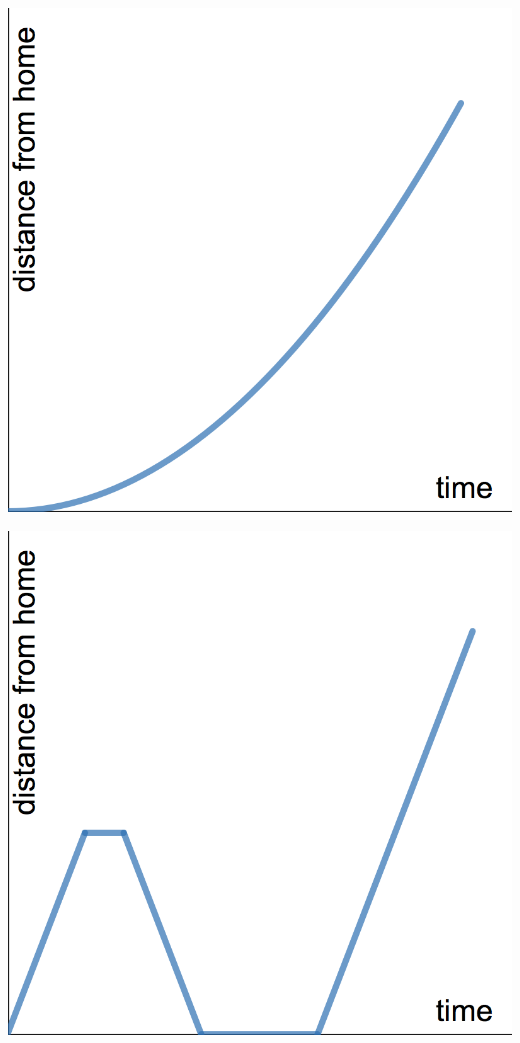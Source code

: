 \documentclass[11pt]{exam}
\theoremstyle{definition}
\begin{document}
\begin{questions}
\begin{enumerate}[(I)]
\begin{minipage}{.25\textwidth}
	\end{minipage}
	\begin{minipage}{.25\textwidth}
	\item \includegraphics[scale=0.1]{graph3.png}
	\end{minipage}
	\begin{minipage}{.25\textwidth}
	\item \includegraphics[scale=0.1]{graph4.png}
	\end{minipage}
	\end{enumerate}


\end{questions}
\end{document}
